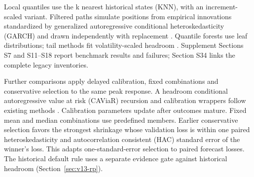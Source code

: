 \documentclass[11pt,a4paper]{article}
\begin{document}
Local quantiles use the k nearest historical states (KNN), with an increment-scaled variant. Filtered paths simulate positions from empirical innovations standardized by generalized autoregressive conditional heteroskedasticity (GARCH) and drawn independently with replacement \citep{hull1998,barone1999}. Quantile forests use leaf distributions; tail methods fit volatility-scaled headroom \citep{meinshausen2006,mcneilfrey2000}. Supplement Sections S7 and S11--S18 report benchmark results and failures; Section S34 links the complete legacy inventories.

Further comparisons apply delayed calibration, fixed combinations and conservative selection to the same peak response. A headroom conditional autoregressive value at risk (CAViaR) recursion and calibration wrappers follow existing methods \citep{engle2004,gibbs2021}. Calibration parameters update after outcomes mature. Fixed mean and median combinations use predefined members. Earlier conservative selection favors the strongest shrinkage whose validation loss is within one paired heteroskedasticity and autocorrelation consistent (HAC) standard error of the winner's loss. This adapts one-standard-error selection \citep{hastie2009} to paired forecast losses. The historical default rule uses a separate evidence gate against historical headroom (Section~\ref{sec:v13-rp}).
\end{document}
